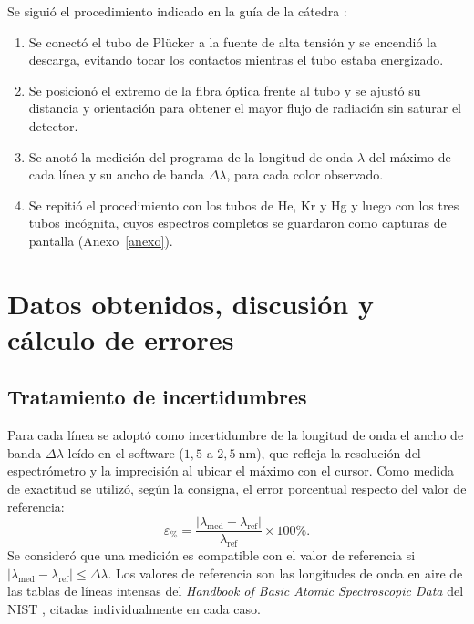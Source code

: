 \documentclass{article}
\newcommand{\nm}{\ \mathrm{nm}}
\begin{document}
Se siguió el procedimiento indicado en la guía de la cátedra \cite{consigna}:

\begin{enumerate}
    \item Se conectó el tubo de Plücker a la fuente de alta tensión y se encendió la descarga, evitando tocar los contactos mientras el tubo estaba energizado.
    \item Se posicionó el extremo de la fibra óptica frente al tubo y se ajustó su distancia y orientación para obtener el mayor flujo de radiación sin saturar el detector.
    \item Se anotó la medición del programa de la longitud de onda $\lambda$ del máximo de cada línea y su ancho de banda $\Delta\lambda$, para cada color observado.
    \item Se repitió el procedimiento con los tubos de He, Kr y Hg y luego con los tres tubos incógnita, cuyos espectros completos se guardaron como capturas de pantalla (Anexo~\ref{anexo}).
\end{enumerate}

\section{Datos obtenidos, discusión y cálculo de errores}

\subsection{Tratamiento de incertidumbres}

Para cada línea se adoptó como incertidumbre de la longitud de onda el ancho de banda $\Delta\lambda$ leído en el software ($1,5$ a $2,5\nm$), que refleja la resolución del espectrómetro y la imprecisión al ubicar el máximo con el cursor. Como medida de exactitud se utilizó, según la consigna, el error porcentual respecto del valor de referencia:
\begin{equation}
    \varepsilon_{\%}=\frac{\left|\lambda_{\mathrm{med}}-\lambda_{\mathrm{ref}}\right|}{\lambda_{\mathrm{ref}}}\times100\%.
    \label{eq:error}
\end{equation}
Se consideró que una medición es compatible con el valor de referencia si $|\lambda_{\mathrm{med}}-\lambda_{\mathrm{ref}}|\le\Delta\lambda$. Los valores de referencia son las longitudes de onda en aire de las tablas de líneas intensas del \emph{Handbook of Basic Atomic Spectroscopic Data} del NIST \cite{nist-handbook}, citadas individualmente en cada caso.
\end{document}
